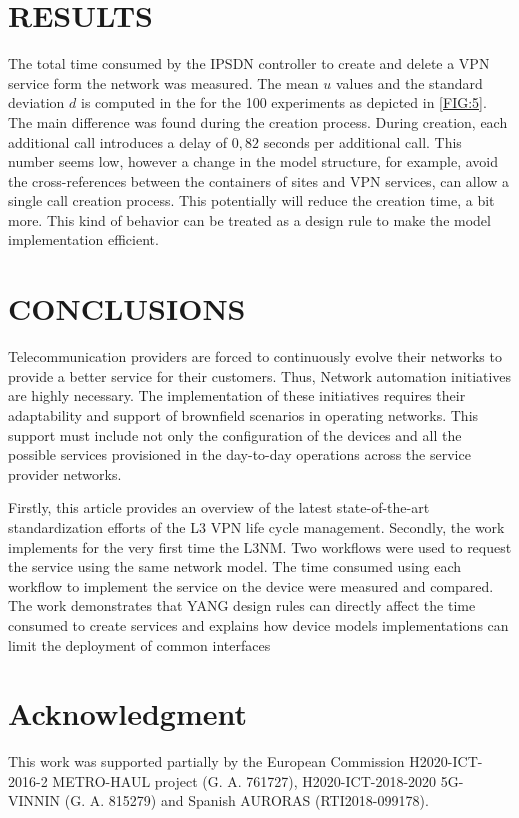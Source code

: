 \documentclass[conference]{IEEEtran}
\begin{document}
\section{RESULTS}
\label{sect:resul}

The total time consumed by the IPSDN controller to create and delete a VPN service form the network was measured. The mean $u$ values and the standard deviation $d$ is computed in the for the 100 experiments as depicted in \cref{FIG:5}. The main difference was found during the creation process. During creation, each additional call introduces a delay of $0,82$ seconds per additional call. This number seems low, however a change in the model structure, for example, avoid the cross-references between the containers of sites and VPN services, can allow a single call creation process. This potentially will reduce the creation time, a bit more. This kind of behavior can be treated as a design rule to make the model implementation efficient. 

\section{CONCLUSIONS}
\label{sect:conclu}

Telecommunication providers are forced to continuously evolve their networks to provide a better service for their customers. Thus, Network automation initiatives are highly necessary.  The implementation of these initiatives requires their adaptability and support of brownfield scenarios in operating networks. This support must include not only the configuration of the devices and all the possible services provisioned in the day-to-day operations across the service provider networks. 

Firstly, this article provides an overview of the latest state-of-the-art standardization efforts of the L3 VPN life cycle management. Secondly, the work implements for the very first time the L3NM. Two workflows were used to request the service using the same network model. The time consumed using each workflow to implement the service on the device were measured and compared. The work demonstrates that YANG design rules can directly affect the time consumed to create services and explains how device models implementations can limit the deployment of common interfaces

\section*{Acknowledgment}
This work was supported partially by the European Commission H2020-ICT-2016-2 METRO-HAUL project (G. A. 761727), H2020-ICT-2018-2020 5G-VINNIN (G. A. 815279) and Spanish AURORAS (RTI2018-099178).



\end{document}
